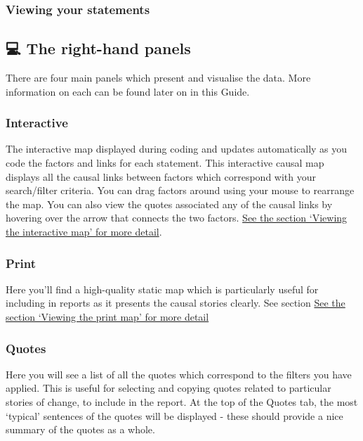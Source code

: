 \documentclass[
]{book}
\begin{document}
\hypertarget{viewing-your-statements}{%
\subsubsection{Viewing your statements}\label{viewing-your-statements}}

\hypertarget{the-right-hand-panels}{%
\subsection{💻 The right-hand panels}\label{the-right-hand-panels}}

There are four main panels which present and visualise the data. More information on each can be found later on in this Guide.

\hypertarget{interactive}{%
\subsubsection{Interactive}\label{interactive}}

The interactive map displayed during coding and updates automatically as you code the factors and links for each statement. This interactive causal map displays all the causal links between factors which correspond with your search/filter criteria. You can drag factors around using your mouse to rearrange the map. You can also view the quotes associated any of the causal links by hovering over the arrow that connects the two factors. \protect\hyperlink{viewing-the-interactive-map}{See the section `Viewing the interactive map' for more detail}.

\hypertarget{print}{%
\subsubsection{Print}\label{print}}

Here you'll find a high-quality static map which is particularly useful for including in reports as it presents the causal stories clearly. See section \protect\hyperlink{viewing-the-print-map}{See the section `Viewing the print map' for more detail}

\hypertarget{quotes}{%
\subsubsection{Quotes}\label{quotes}}

Here you will see a list of all the quotes which correspond to the filters you have applied. This is useful for selecting and copying quotes related to particular stories of change, to include in the report. At the top of the Quotes tab, the most `typical' sentences of the quotes will be displayed - these should provide a nice summary of the quotes as a whole.
\end{document}
